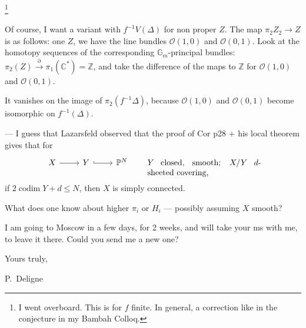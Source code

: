 \documentclass[11pt,a4paper]{article}
\theoremstyle{plain}
\theoremstyle{definition}
\DeclareMathOperator{\codim}{codim}
\begin{document}
\footnote{I went overboard. This is for $f$ finite. In general, a correction like in the conjecture in my Bambah Colloq.}

\medskip

Of course, I want a variant with $f^{-1}V(\Delta)$ for non proper $Z$. The map $\pi_2 Z_2 \to Z$ is as follows: one $Z$, we have the line bundles $\mathcal{O}(1,0)$ and $\mathcal{O}(0,1)$. Look at the homotopy sequences of the corresponding $\mathbb{G}_m$-principal bundles: $\pi_2(Z) \xrightarrow{\partial} \pi_1(\mathbb{C}^*) = \mathbb{Z}$, and take the difference of the maps to $\mathbb{Z}$ for $\mathcal{O}(1,0)$ and $\mathcal{O}(0,1)$.

It vanishes on the image of $\pi_2(f^{-1}\Delta)$, because $\mathcal{O}(1,0)$ and $\mathcal{O}(0,1)$ become isomorphic on $f^{-1}(\Delta)$.

\medskip

--- I guess that Lazarsfeld observed that the proof of Cor p28 + his local theorem gives that for
\[
\begin{tikzcd}
X \arrow[r] & Y \arrow[r, hook] & \mathbb{P}^N
\end{tikzcd}
\qquad
\begin{minipage}[t]{0.4\textwidth}
$Y$ closed, smooth; $X/Y$ $d$-sheeted covering,
\end{minipage}
\]
if $2\codim Y + d \leq N$, then $X$ is simply connected.

What does one know about higher $\pi_i$ or $H_i$ --- possibly assuming $X$ smooth?

\vspace{1cm}

I am going to Moscow in a few days, for 2 weeks, and will take your ms with me, to leave it there. Could you send me a new one?

\vspace{1cm}

\begin{flushright}
Yours truly,

P.~Deligne
\end{flushright}
\end{document}
